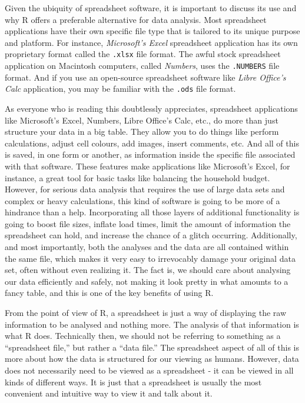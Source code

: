 Given the ubiquity of spreadsheet software, it is important to discuss its use and why R offers a preferable alternative for data analysis. Most spreadsheet applications have their own specific file type that is tailored to its unique purpose and platform. For instance, \textit{Microsoft's Excel} spreadsheet application has its own proprietary format called the \texttt{.xlsx} file format. The awful stock spreadsheet application on Macintosh computers, called \textit{Numbers}, uses the \texttt{.NUMBERS} file format. And if you use an open-source spreadsheet software like \textit{Libre Office's Calc} application, you may be familiar with the \texttt{.ods} file format.

As everyone who is reading this doubtlessly appreciates, spreadsheet applications like Microsoft's Excel, Numbers, Libre Office's Calc, etc., do more than just structure your data in a big table.  They allow you to do things like perform calculations, adjust cell colours, add images, insert comments, etc. And all of this is saved, in one form or another, as information inside the specific file associated with that software. These features make applications like Microsoft's Excel, for instance, a great tool for basic tasks like balancing the household budget.  However, for serious data analysis that requires the use of large data sets and complex or heavy calculations, this kind of software is going to be more of a hindrance than a help. Incorporating all those layers of additional functionality is going to boost file sizes, inflate load times, limit the amount of information the spreadsheet can hold, and increase the chance of a glitch occurring. Additionally, and most importantly, both the analyses and the data are all contained within the same file, which makes it very easy to irrevocably damage your original data set, often without even realizing it. The fact is, we should care about analysing our data efficiently and safely, not making it look pretty in what amounts to a fancy table, and this is one of the key benefits of using R.

From the point of view of R, a spreadsheet is just a way of displaying the raw information to be analysed and nothing more. The analysis of that information is what R does. Technically then, we should not be referring to something as a ``spreadsheet file,'' but rather a ``data file.'' The spreadsheet aspect of all of this is more about how the data is structured for our viewing as humans. However, data does not necessarily need to be viewed as a spreadsheet - it can be viewed in all kinds of different ways. It is just that a spreadsheet is usually the most convenient and intuitive way to view it and talk about it.

